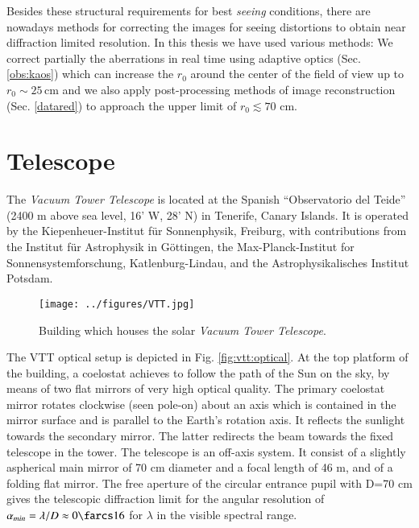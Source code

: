 Besides these structural requirements for best \emph{seeing} conditions, there are nowadays methods for correcting the images for seeing distortions to obtain near diffraction limited resolution. In this thesis we have used various methods: We correct partially the aberrations in real time using adaptive optics (Sec. \ref{obs:kaos}) which can increase the $r_{0}$ around the center of the field of view up to $r_{0}\sim 25$\,cm and we also apply post-processing methods of image reconstruction (Sec. \ref{datared}) to approach the upper limit of $r_{0} \lesssim 70$ cm.


\newpage
\section{Telescope\label{sec:telescope}}
The \emph{Vacuum Tower Telescope} \citep[VTT,][ Fig. \ref{fig:foto:vtt}]{1985spit.conf.1191S} is located at the Spanish ``Observatorio del Teide'' (2400 m above sea level, 16' W, 28' N) in Tenerife, Canary Islands. It is operated by the Kiepenheuer-Institut f\"ur Sonnenphysik, Freiburg, with contributions from the Institut f\"ur Astrophysik in G\"ottingen, the Max-Planck-Institut for Sonnensystemforschung, Katlenburg-Lindau,  and the Astrophysikalisches Institut Potsdam.


\begin{wrapfigure}[19]{r}{0.4\textwidth}
\vspace{-0.4cm}
\begin{center}
\texttt{[image: ../figures/VTT.jpg]}
\caption{Building which houses the solar \emph{Vacuum Tower Telescope}.}
\label{fig:foto:vtt}
\end{center}
\end{wrapfigure}

The VTT optical setup is depicted in Fig. \ref{fig:vtt:optical}. At the top platform of the building, a coelostat achieves to follow the path of the Sun on the sky, by means of two flat mirrors of very high optical quality. The primary coelostat mirror rotates clockwise (seen pole-on) about an axis which is contained in the mirror surface and is parallel to the Earth's rotation axis. It reflects the sunlight towards the secondary mirror. The latter redirects the beam towards the fixed telescope in the tower. The telescope is an off-axis system. It consist of a slightly aspherical main mirror of 70 cm diameter and a focal length of 46 m, and of a folding flat mirror. The free aperture of the circular entrance pupil with D=70 cm gives the telescopic diffraction limit for the  angular resolution of $\alpha_{min}=\lambda/D \approx0\farcs16$ for $\lambda$ in the visible spectral range. 

